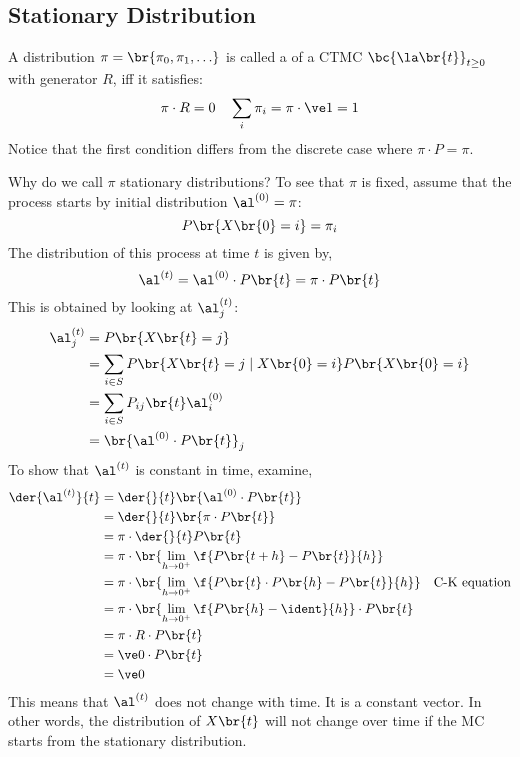 \documentclass{article}
\begin{document}
    \subsection{Stationary Distribution}
    \begin{definition}
        A distribution $\pi = \br{\pi_0, \pi_1, \ldots}$ is called a  of a CTMC $\bc{\la\br{t}}_{t \geq 0}$ with generator $R$, iff it satisfies:
        \[ \pi \cdot R = 0 \quad \sum_{i} \pi_i = \pi \cdot \ve 1 = 1 \]
        Notice that the first condition differs from the discrete case where $\pi \cdot P = \pi$.
    \end{definition}
    Why do we call $\pi$ stationary distributions? To see that $\pi$ is fixed, assume that the process starts by initial distribution $\al^{(0)} = \pi$:
    \[ P\br{X\br{0} =  i} = \pi_i \]
    The distribution of this process at time $t$ is given by,
    \[ \al^{(t)} = \al^{(0)} \cdot P\br{t} = \pi \cdot P \br{t} \]
    This is obtained by looking at $\al_{j}^{(t)}$:
    \begin{align*}
    \al_j^{(t)}
    &= P\br{X\br{t} = j} \\
    &= \sum_{i\in S}P\br{X\br{t} = j \mid X\br{0} = i}P\br{X\br{0} = i} \\
    &= \sum_{i\in S}P_{ij}\br{t}\al_{i}^{(0)} \\
    &= \br{\al^{(0)} \cdot P\br{t}}_{j}
    \end{align*}
    To show that $\al^{(t)}$ is constant in time, examine,
    \begin{align*}
        \der{\al^{(t)}}{t}
        &= \der{}{t} \br{\al^{(0)} \cdot P\br{t}}\\
        &= \der{}{t} \br{\pi \cdot P\br{t}}\\
        &= \pi \cdot \der{}{t} P\br{t} \\
        &= \pi \cdot \br{\lim_{h \to 0^{+}} \f{P\br{t + h} - P\br{t}}{h}} \\
        &= \pi \cdot \br{\lim_{h \to 0^{+}} \f{P\br{t}\cdot P\br{h} - P\br{t}}{h}} \quad \text{C-K equation} \\
        &= \pi \cdot \br{\lim_{h \to 0^{+}} \f{P\br{h} - \ident}{h}} \cdot P\br{t} \\
        &= \pi \cdot R \cdot P\br{t} \\
        &= \ve 0\cdot P\br{t} \\
        &= \ve 0
    \end{align*}
    This means that $\al^{(t)}$ does not change with time. It is a constant vector. In other words, the distribution of $X\br{t}$ will not change over time if the MC starts from the stationary distribution.
\end{document}
